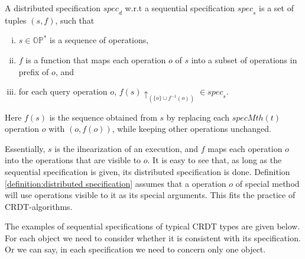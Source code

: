 
\begin{definition}
\label{definition:distributed specification}
A distributed specification $\mathit{spec}_d$ w.r.t a sequential specification $\mathit{spec}_s$ is a set of tuples $(s,f)$, such that

\begin{enumerate}[(i)]
\item $s \in \mathbb{OP}^*$ is a sequence of operations,
\item $f$ is a function that maps each operation $o$ of $s$ into a subset of operations in prefix of $o$, and
\item for each query operation $o$, $f(s) \uparrow_{ ( \{ o \} \cup f^{-1}(o))} \in \mathit{spec}_s$.
\end{enumerate}

Here $f(s)$ is the sequence obtained from $s$ by replacing each $\mathit{specMth}(t)$ operation $o$ with $(o,f(o))$, while keeping other operations unchanged.
\end{definition}

Essentially, $s$ is the ilnearization of an execution, and $f$ maps each operation $o$ into the operations that are visible to $o$. It is easy to see that, as long as the sequential specification is given, its distributed specification is done. Definition \ref{definition:distributed specification} assumes that a operation $o$ of special method will use operations visible to it as its special arguments. This fits the practice of CRDT-algorithms.

The examples of sequential specifications of typical CRDT types are given below. For each object we need to consider whether it is consistent with its specification. Or we can say, in each specification we need to concern only one object.

